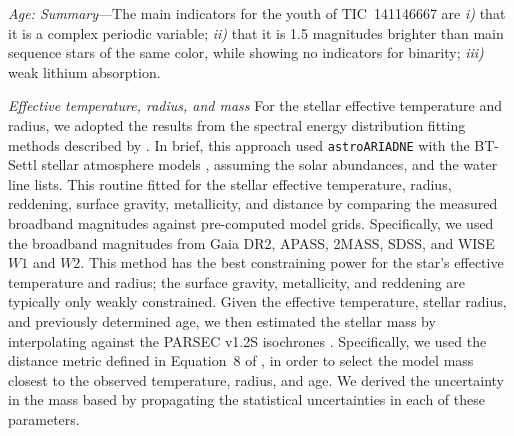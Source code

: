 \documentclass{nature3}
\begin{document}
\begin{methods}
{\it Age: Summary}---The main indicators for the youth of
TIC~141146667 are {\it i)} that it is a complex periodic variable;
{\it ii)} that it is 1.5 magnitudes brighter than main sequence stars
of the same color, while showing no indicators for binarity; {\it
iii)} weak lithium absorption.





{\it Effective temperature, radius, and mass}
For the stellar effective temperature and radius, we adopted the results
from the spectral energy distribution fitting methods described by
\cite{Bouma2024}.
In brief, this approach used \texttt{astroARIADNE} \cite{Vines2022} with
the BT-Settl stellar atmosphere models \cite{Allard2012}, assuming the
\cite{Asplund2009} solar abundances, and the \cite{Barber2006} water
line lists.  
This routine fitted for the stellar effective temperature, radius,
reddening, surface gravity, metallicity, and distance by comparing the
measured broadband magnitudes against pre-computed model grids.
Specifically, we used the broadband magnitudes from Gaia DR2, APASS,
2MASS, SDSS, and WISE $W1$ and $W2$.
This method has the best constraining power for the star's effective
temperature and radius; the surface gravity, metallicity, and reddening
are typically only weakly constrained.
Given the effective temperature, stellar radius, and previously
determined age, we then estimated the stellar mass by interpolating
against the PARSEC v1.2S isochrones \cite{Chen2014}. 
Specifically, we used the distance metric defined in Equation~8 of
\cite{Bouma2024}, in order to select the model mass closest to the
observed temperature, radius, and age.  We derived the uncertainty in
the mass based by propagating the statistical uncertainties in each of
these parameters.





\end{methods}
\end{document}
